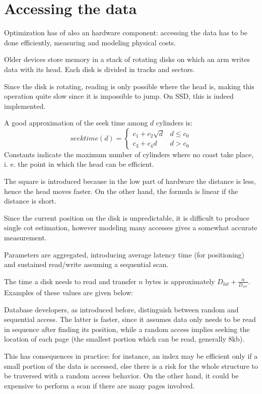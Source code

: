\section{Accessing the data}
Optimization has of also an hardware component: accessing the data has to be done efficiently, measuring and modeling physical costs. 

Older devices store memory in a stack of rotating disks on which an arm writes data with its head. Each disk is divided in tracks and sectors.

Since the disk is rotating, reading is only possible where the head is, making this operation quite slow since it is impossible to jump. On SSD, this is indeed implemented.

A good approximation of the seek time among $d$ cylinders is:
$$seektime(d) = \begin{cases}
	c_1 + c_2\sqrt{d} & d \leq c_0 \\
	c_3 + c_4d & d> c_0
\end{cases}$$
Constants indicate the maximum number of cylinders where no coast take place, i. e. the point in which the head can be efficient. 

The square is introduced because in the low part of hardware the distance is less, hence the head moves faster. On the other hand, the formula is linear if the distance is short.

Since the current position on the disk is unpredictable, it is difficult to produce single cot estimation, however modeling many accesses gives a somewhat accurate measurement. 

Parameters are aggregated, introducing average latency time (for positioning) and sustained read/write assuming a sequential scan. 

The time a disk needs to read and transfer $n$ bytes is approximately $D_{lat} + \frac{n}{D_{srr}}$. Examples of these values are given below:

Database developers, as introduced before, distinguish between random and sequential access. The latter is faster, since it assumes data only needs to be read in sequence after finding its position, while a random access implies seeking the location of each page (the smallest portion which can be read, generally 8kb).

This has consequences in practice: for instance, an index may be efficient only if a small portion of the data is accessed, else there is a risk for the whole structure to be traversed with a random access behavior. On the other hand, it could be expensive to perform a scan if there are many pages involved. 

